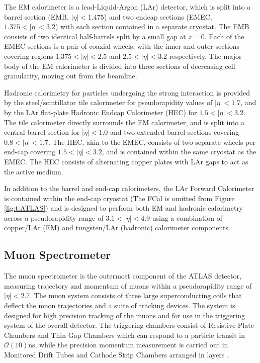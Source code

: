 		The EM calorimeter \cite{larcalo} is a lead-Liquid-Argon (LAr) detector, which is split into a barrel section (EMB, $|\eta|<1.475$) and two endcap sections (EMEC, $1.375<|\eta|<3.2$) with each section contained in a separate cryostat. The EMB consists of two identical half-barrels split by a small gap at $z=0$. Each of the EMEC sections is a pair of coaxial wheels, with the inner and outer sections covering regions $1.375<|\eta|<2.5$ and $2.5<|\eta|<3.2$ respectively. The major body of the EM calorimeter is divided into three sections of decreasing cell granularity, moving out from the beamline.

		Hadronic calorimetry for particles undergoing the strong interaction is provided by the steel/scintillator tile calorimeter \cite{atlastile} for pseudorapidity values of $|\eta|<1.7$, and by the LAr flat-plate Hadronic Endcap Calorimeter (HEC) for $1.5<|\eta|<3.2$. The tile calorimeter directly surrounds the EM calorimeter, and is split into a central barrel section for $|\eta| < 1.0$ and two extended barrel sections covering $0.8<|\eta|<1.7$. The HEC, akin to the EMEC, consists of two separate wheels per end-cap covering $1.5<|\eta|<3.2$, and is contained within the same cryostat as the EMEC. The HEC consists of alternating copper plates with LAr gaps to act as the active medium.

		In addition to the barrel and end-cap calorimeters, the LAr Forward Calorimeter \cite{forwardcal} is contained within the end-cap cryostat (The FCal is omitted from Figure \ref{fig:t:ATLAS}) and is designed to perform both EM and hadronic calorimetry across a pseudorapidity range of $3.1<|\eta|<4.9$ using a combination of copper/LAr (EM) and tungsten/LAr (hadronic) calorimeter components.

	\subsection{Muon Spectrometer}

		The muon spectrometer is the outermost component of the ATLAS detector, measuring trajectory and momentum of muons within a pseudorapidity range of $|\eta| < 2.7$. The muon system consists of three large superconducting coils that deflect the muon trajectories and a suite of tracking devices. The system is designed for high precision tracking of the muons and for use in the triggering system of the overall detector. The triggering chambers consist of Resistive Plate Chambers and Thin Gap Chambers which can respond to a particle transit in $\mathcal{O}(10)$ns, while the precision momentum measurement is carried out in Monitored Drift Tubes and Cathode Strip Chambers arranged in layers \cite{ATLAS}.


